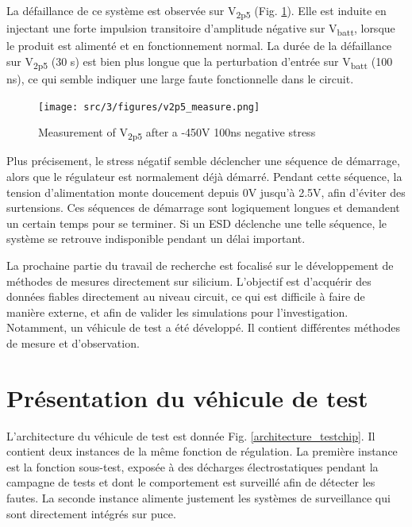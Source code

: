 La défaillance de ce système est observée sur V\textsubscript{2p5} (Fig. \ref{fig:meas-reset-v2p5}).
Elle est induite en injectant une forte impulsion transitoire d'amplitude négative sur V\textsubscript{batt}, lorsque le produit est alimenté et en fonctionnement normal.
La durée de la défaillance sur V\textsubscript{2p5} (30 \textmu{}s) est bien plus longue que la perturbation d'entrée sur V\textsubscript{batt} (100 ns), ce qui semble indiquer une large faute fonctionnelle dans le circuit.

\begin{figure}[!h]
  \centering
  \texttt{[image: src/3/figures/v2p5\_measure.png]}
  \caption{Measurement of V\textsubscript{2p5} after a -450V 100ns negative stress}
  \label{fig:meas-reset-v2p5}
\end{figure}

Plus précisement, le stress négatif semble déclencher une séquence de démarrage, alors que le régulateur est normalement déjà démarré.
Pendant cette séquence, la tension d'alimentation monte doucement depuis 0V jusqu'à 2.5V, afin d'éviter des surtensions.
Ces séquences de démarrage sont logiquement longues et demandent un certain temps pour se terminer.
Si un ESD déclenche une telle séquence, le système se retrouve indisponible pendant un délai important.

La prochaine partie du travail de recherche est focalisé sur le développement de méthodes de mesures directement sur silicium.
L'objectif est d'acquérir des données fiables directement au niveau circuit, ce qui est difficile à faire de manière externe, et afin de valider les simulations pour l'investigation.
Notamment, un véhicule de test a été développé.
Il contient différentes méthodes de mesure et d'observation.

\section{Présentation du véhicule de test}

L'architecture du véhicule de test est donnée Fig. \ref{architecture_testchip}.
Il contient deux instances de la même fonction de régulation.
La première instance est la fonction sous-test, exposée à des décharges électrostatiques pendant la campagne de tests et dont le comportement est surveillé afin de détecter les fautes.
La seconde instance alimente justement les systèmes de surveillance qui sont directement intégrés sur puce.

